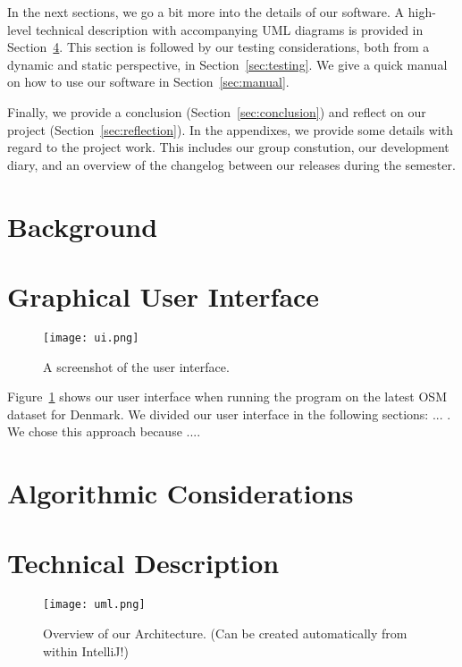 \documentclass[11pt]{article}
\begin{document}
In the next sections, we go a bit more into the details of our software. A high-level technical description with accompanying UML diagrams is provided in Section~\ref{sec:technical}. This section is followed by our testing considerations, both from a dynamic and static perspective, in Section~\ref{sec:testing}. We give a quick manual on how to use our software in Section~\ref{sec:manual}.

Finally, we provide a conclusion (Section~\ref{sec:conclusion}) and reflect on our project (Section~\ref{sec:reflection}). In the appendixes, we provide some details with regard to the project work. This includes our group constution, our development diary, and an overview of the changelog between our releases during the semester.

\section{Background}\label{sec:background}

\section{Graphical User Interface}\label{sec:ui}

\begin{figure}
    \centering
    \texttt{[image: ui.png]}
    \caption{A screenshot of the user interface.}
    \label{fig:ui}
\end{figure}

Figure~\ref{fig:ui} shows our user interface when running the program on the latest OSM dataset for Denmark. We divided our user interface in the following sections: ... . We chose this approach because ....

\section{Algorithmic Considerations}\label{sec:algorithms}

\section{Technical Description}\label{sec:technical}

\begin{figure}[t!]
    \centering
    \texttt{[image: uml.png]}
    \caption{Overview of our Architecture. (Can be created automatically from within IntelliJ!)}
    \label{fig:uml}
\end{figure}
\end{document}
